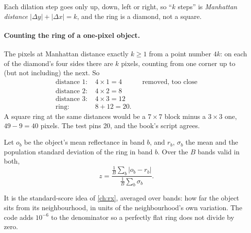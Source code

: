 Each dilation step goes only up, down, left or right, so ``$k$ steps'' is \emph{Manhattan
distance} $|\Delta y| + |\Delta x| = k$, and the ring is a diamond, not a square.

\paragraph{Counting the ring of a one-pixel object.} The pixels at Manhattan distance exactly $k \ge 1$ from a point
number $4k$: on each of the diamond's four sides there are $k$ pixels, counting from one corner up to (but not
including) the next. So
\begin{align*}
\text{distance 1: } & 4 \times 1 = 4 && \text{removed, too close}\\
\text{distance 2: } & 4 \times 2 = 8\\
\text{distance 3: } & 4 \times 3 = 12\\
\text{ring: } & 8 + 12 = 20.
\end{align*}
A square ring at the same distances would be a $7 \times 7$ block minus a $3 \times 3$ one, $49 - 9 = 40$ pixels.
The test  pins 20, and the book's script agrees\tagC{}.


\begin{definition}[Contrast $z$]
Let $o_b$ be the object's mean reflectance in band $b$, and $r_b$, $\sigma_b$ the mean and the population standard
deviation of the ring in band $b$. Over the $B$ bands valid in both,
\begin{equation}\label{eq:benchmarks:z}
z = \frac{\frac1B\sum_b |o_b - r_b|}{\frac1B\sum_b \sigma_b}.
\end{equation}
\end{definition}

It is the standard-score idea of \cref{ch:rx}, averaged over bands: how far the object sits from its neighbourhood, in
units of the neighbourhood's own variation. The code adds $10^{-6}$ to the denominator so a perfectly flat ring does
not divide by zero.


